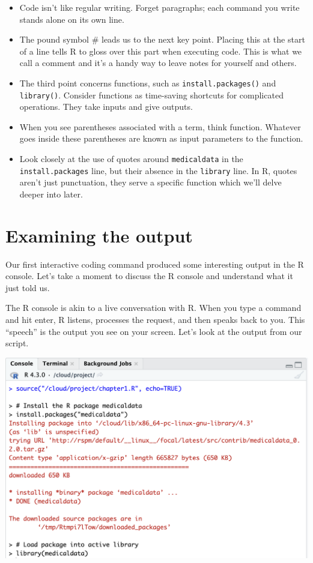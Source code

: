 \documentclass[
  letterpaper,
  DIV=11,
  numbers=noendperiod]{scrreprt}
\begin{document}
\begin{itemize}
\item
  Code isn't like regular writing. Forget paragraphs; each command you
  write stands alone on its own line.
\item
  The pound symbol \# leads us to the next key point. Placing this at
  the start of a line tells R to gloss over this part when executing
  code. This is what we call a comment and it's a handy way to leave
  notes for yourself and others.
\item
  The third point concerns functions, such as
  \texttt{install.packages()} and \texttt{library()}. Consider functions
  as time-saving shortcuts for complicated operations. They take inputs
  and give outputs.
\item
  When you see parentheses associated with a term, think function.
  Whatever goes inside these parentheses are known as input parameters
  to the function.
\item
  Look closely at the use of quotes around \texttt{medicaldata} in the
  \texttt{install.packages} line, but their absence in the
  \texttt{library} line. In R, quotes aren't just punctuation, they
  serve a specific function which we'll delve deeper into later.
\end{itemize}

\hypertarget{examining-the-output}{%
\section{Examining the output}\label{examining-the-output}}

Our first interactive coding command produced some interesting output in
the R console. Let's take a moment to discuss the R console and
understand what it just told us.

The R console is akin to a live conversation with R. When you type a
command and hit enter, R listens, processes the request, and then speaks
back to you. This ``speech'' is the output you see on your screen. Let's
look at the output from our script.

\includegraphics{./images/CleanShot 2023-06-12 at 22.29.32@2x-01.png}
\end{document}
